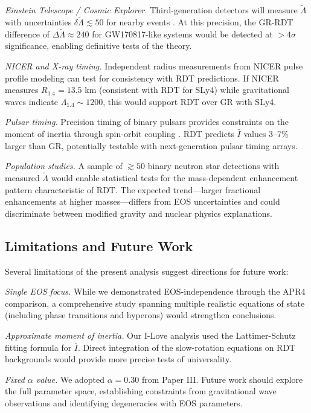 \documentclass[twocolumn,showpacs,preprintnumbers,amsmath,amssymb,prd]{revtex4-2}
\begin{document}
\textit{Einstein Telescope / Cosmic Explorer.} Third-generation detectors will measure $\tilde{\Lambda}$ with uncertainties $\delta\tilde{\Lambda} \lesssim 50$ for nearby events \cite{Maggiore2020}. At this precision, the GR-RDT difference of $\Delta\tilde{\Lambda} \approx 240$ for GW170817-like systems would be detected at $>4\sigma$ significance, enabling definitive tests of the theory.

\textit{NICER and X-ray timing.} Independent radius measurements from NICER pulse profile modeling \cite{Miller2019,Riley2019} can test for consistency with RDT predictions. If NICER measures $R_{1.4} = 13.5$ km (consistent with RDT for SLy4) while gravitational waves indicate $\Lambda_{1.4} \sim 1200$, this would support RDT over GR with SLy4.

\textit{Pulsar timing.} Precision timing of binary pulsars provides constraints on the moment of inertia through spin-orbit coupling \cite{Lattimer2005}. RDT predicts $\bar{I}$ values 3--7\% larger than GR, potentially testable with next-generation pulsar timing arrays.

\textit{Population studies.} A sample of $\gtrsim 50$ binary neutron star detections with measured $\tilde{\Lambda}$ would enable statistical tests for the mass-dependent enhancement pattern characteristic of RDT. The expected trend---larger fractional enhancements at higher masses---differs from EOS uncertainties and could discriminate between modified gravity and nuclear physics explanations.

\subsection{Limitations and Future Work}
\label{sec:conclusions_limitations}

Several limitations of the present analysis suggest directions for future work:

\textit{Single EOS focus.} While we demonstrated EOS-independence through the APR4 comparison, a comprehensive study spanning multiple realistic equations of state (including phase transitions and hyperons) would strengthen conclusions.

\textit{Approximate moment of inertia.} Our I-Love analysis used the Lattimer-Schutz fitting formula for $\bar{I}$. Direct integration of the slow-rotation equations on RDT backgrounds would provide more precise tests of universality.

\textit{Fixed $\alpha$ value.} We adopted $\alpha = 0.30$ from Paper III. Future work should explore the full parameter space, establishing constraints from gravitational wave observations and identifying degeneracies with EOS parameters.
\end{document}
